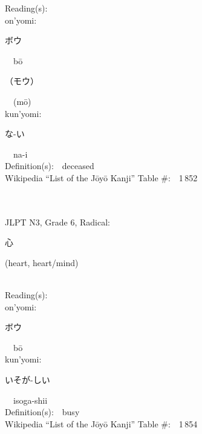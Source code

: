 \begin{multicols}{2}
Reading(s):\ \ \\
{\hspace*{1em}}on'yomi:\ \ \\
{\hspace*{2em}}{\begin{CJK}{UTF8}{min} ボウ \end{CJK}}\ \ b\=o\ \ \\
{\hspace*{2em}}{\begin{CJK}{UTF8}{min} （モウ） \end{CJK}}\ \ (m\=o)\ \ \\
{\hspace*{1em}}kun'yomi:\ \ \\
{\hspace*{2em}}{\begin{CJK}{UTF8}{min} な-い \end{CJK}}\ \ na-i\ \ \\
Definition(s):\ \ deceased \\
Wikipedia ``List of the J\=oy\=o Kanji'' Table \#:\ \ 1\,852 \\
\ \ \\
{\fontsize{34pt}{40pt}  }\ \ \\  %
{JLPT N3, Grade 6, Radical:\ \ {\begin{CJK}{UTF8}{min} 心 \end{CJK}} (heart, heart/mind) } \\
Reading(s):\ \ \\
{\hspace*{1em}}on'yomi:\ \ \\
{\hspace*{2em}}{\begin{CJK}{UTF8}{min} ボウ \end{CJK}}\ \ b\=o\ \ \\
{\hspace*{1em}}kun'yomi:\ \ \\
{\hspace*{2em}}{\begin{CJK}{UTF8}{min} いそが-しい \end{CJK}}\ \ isoga-shii\ \ \\
Definition(s):\ \ busy \\
Wikipedia ``List of the J\=oy\=o Kanji'' Table \#:\ \ 1\,854 \\

\end{multicols}
